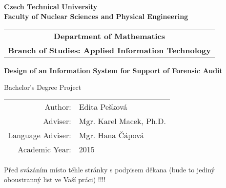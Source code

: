 \documentclass[a4paper,12pt]{report}
\newcommand{\cvut}{Czech Technical University}
\newcommand{\fjfi}{Faculty of Nuclear Sciences and Physical Engineering}
\newcommand{\kse}{Department of Mathematics}
\newcommand{\obor}{Applied Information Technology}
\newcommand{\zamereni}{}
\newcommand{\nazevcz}{Návrh informačního systému pro podporu forenzního auditu}        %
\newcommand{\nazeven}{Design of an Information System for Support of Forensic Audit}     %
\newcommand{\autor}{Edita Pešková}           %
\newcommand{\rok}{2015}                %
\newcommand{\vedouci}{Mgr. Karel Macek, Ph.D.}         %
\begin{document}
\thispagestyle{empty}

\begin{center}
    {\Large \bf \cvut\\[2mm] \fjfi }
    \vspace{10mm}

    \begin{tabular}{c}
    {\bf \kse}\\
    {\bf Branch of Studies: \obor}\\
    \end{tabular}

   \vspace{10mm} \epsfysize=25mm  \vspace{15mm}
   \vspace{50mm}

   {\Huge \bf \nazeven\par}

   \vspace{15mm}
   {\Large Bachelor's Degree Project}

   \vfill
   {\large
    \begin{tabular}{rl}
    Author: & \autor\\
    Adviser: & \vedouci\\
    Language Adviser: & Mgr. Hana Čápová\\
    Academic Year: & \rok
    \end{tabular}
   }
\end{center}



\newpage  %
\thispagestyle{empty} Před svázáním místo téhle stránky  s podpisem
děkana (bude to jediný oboustranný list ve Vaší práci) !!!!



\newpage %
\thispagestyle{empty}  %
\end{document}
